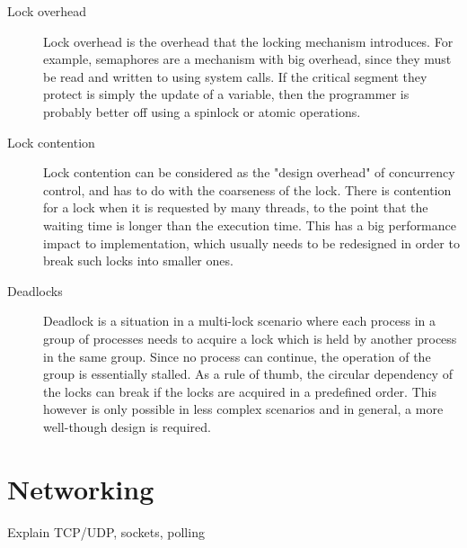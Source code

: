 \begin{description}
	\item[Lock overhead]
		Lock overhead is the overhead that the locking mechanism introduces.  
		For example, semaphores are a mechanism with big overhead, since they 
		must be read and written to using system calls. If the critical segment 
		they protect is simply the update of a variable, then the programmer is 
		probably better off using a spinlock or atomic operations.
	\item[Lock contention]
		Lock contention can be considered as the "design overhead" of 
		concurrency control, and has to do with the coarseness of the lock.  
		There is contention for a lock when it is requested by many threads, to 
		the point that the waiting time is longer than the execution time.
		This has a big performance impact to implementation, which usually 
		needs to be redesigned in order to break such locks into smaller ones.
	\item[Deadlocks]
		Deadlock is a situation in a multi-lock scenario where each process in 
		a group of processes needs to acquire a lock which is held by another 
		process in the same group. Since no process can continue, the operation 
		of the group is essentially stalled.
		As a rule of thumb, the circular dependency of the locks can break if 
		the locks are acquired in a predefined order. This however is only 
		possible in less complex scenarios and in general, a more well-though 
		design is required.
\end{description}

\section{Networking}

Explain TCP/UDP, sockets, polling
